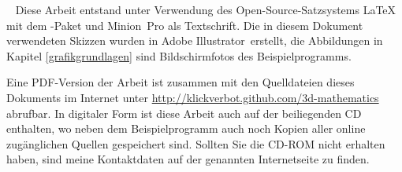 \thispagestyle{plain}
\clearpage
~\vfill
\scriptsize
Diese Arbeit entstand unter Verwendung des Open-Source-Satzsystems \LaTeX{} mit dem \KOMAScript-Paket und Minion~Pro als Textschrift.
Die in diesem Dokument verwendeten Skizzen wurden in Adobe Illustrator\textregistered\ erstellt, die Abbildungen in Kapitel \ref{grafikgrundlagen} sind Bildschirmfotos des Beispielprogramms.

Eine PDF-Version der Arbeit ist zusammen mit den Quelldateien dieses Dokuments im Internet unter \url{http://klickverbot.github.com/3d-mathematics} abrufbar. In digitaler Form ist diese Arbeit auch auf der beiliegenden CD enthalten, wo neben dem Beispielprogramm auch noch Kopien aller online zugänglichen Quellen gespeichert sind. Sollten Sie die CD-ROM nicht erhalten haben, sind meine Kontaktdaten auf der genannten Internetseite zu finden.